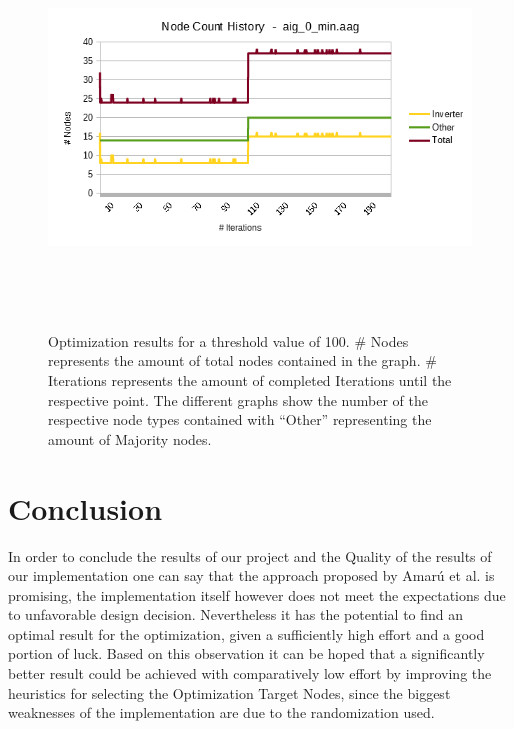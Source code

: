 \documentclass[
	accentcolor=1c,%
	type=intern,
	marginpar=false,
	ruledheaders=section,
	class=report,
	BCOR=5mm,
      parskip=half-,
	fontsize=10pt
	]{tudapub}
\begin{document}
\begin{figure}[!ht]
\begin{minipage}{\textwidth}
\begin{minipage}{.45\textwidth}
						\label{fig_5}
					\end{minipage}\\
				\end{minipage}\\[1em]\\
				\begin{minipage}{\textwidth}
					\centering
					\begin{minipage}{.45\textwidth}
						\includegraphics[width=\textwidth]{images/eval_6.png}
						\caption{Optimization results for a threshold value of 100. \# Nodes represents the amount of total nodes contained in the graph. \# Iterations represents the amount of completed Iterations until the respective point. The different graphs show the number of the respective node types contained with ``Other'' representing the amount of Majority nodes.}
						\label{fig_6}
					\end{minipage}\\
				\end{minipage}\\[1em]
			\end{figure}

	\section{Conclusion}
	In order to conclude the results of our project and the Quality of the results of our implementation one can say that the approach proposed by Amarú et al. is promising, the implementation itself however does not meet the expectations due to unfavorable design decision.
	Nevertheless it has the potential to find an optimal result for the optimization, given a sufficiently high effort and a good portion of luck.
	Based on this observation it can be hoped that a significantly better result could be achieved with comparatively low effort by improving the heuristics for selecting the Optimization Target Nodes, since the biggest weaknesses of the implementation are due to the randomization used.
\end{document}
